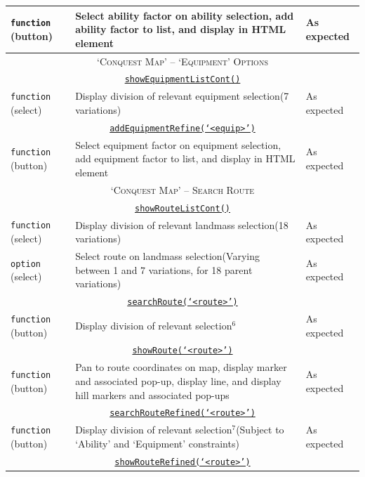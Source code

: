 \documentclass[11pt, english]{article}
\begin{document}
\begin{center}
\begin{longtable}{p{3cm}p{8cm}p{2cm}}
		\texttt{function} (button) & Select ability factor on ability selection, add ability factor to list, and display in HTML element & As expected\\
		\hline
		\multicolumn{3}{c}{\textsc{`Conquest Map' -- `Equipment' Options}}\\
		\hline
		\multicolumn{3}{c}{\underline{\texttt{showEquipmentListCont()}}}\\
		\texttt{function} (select) & Display division of relevant equipment selection\newline (7 variations) & As expected\\
		\multicolumn{3}{c}{\underline{\texttt{addEquipmentRefine(`<equip>')}}}\\
		\texttt{function} (button) & Select equipment factor on equipment selection, add equipment factor to list, and display in HTML element & As expected\\
		\hline
		\multicolumn{3}{c}{\textsc{`Conquest Map' -- Search Route}}\\
		\hline
		\multicolumn{3}{c}{\underline{\texttt{showRouteListCont()}}}\\
		\texttt{function} (select) & Display division of relevant landmass selection\newline (18 variations) & As expected\\
		\texttt{option} (select) & Select route on landmass selection\newline (Varying between 1 and 7 variations, for 18 parent variations) & As expected\\
		\multicolumn{3}{c}{\underline{\texttt{searchRoute(`<route>')}}}\\
		\texttt{function} (button) & Display division of relevant selection$^{6}$ & As expected\\
		\multicolumn{3}{c}{\underline{\texttt{showRoute(`<route>')}}}\\
		\texttt{function} (button) & Pan to route coordinates on map, display marker and associated pop-up, display line, and display hill markers and associated pop-ups & As expected\\
		\multicolumn{3}{c}{\underline{\texttt{searchRouteRefined(`<route>')}}}\\
		\texttt{function} (button) & Display division of relevant selection$^{7}$\newline (Subject to `Ability' and `Equipment' constraints) & As expected\\
		\multicolumn{3}{c}{\underline{\texttt{showRouteRefined(`<route>')}}}\\

\end{longtable}
\end{center}
\end{document}
